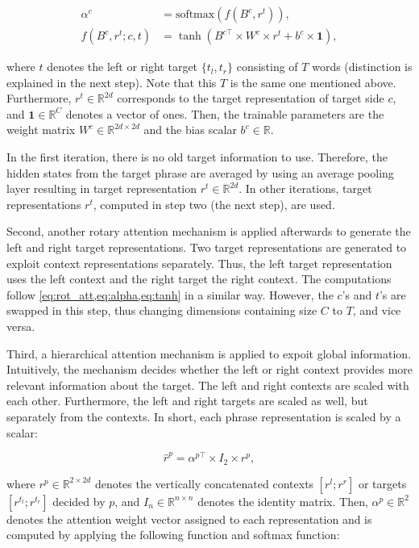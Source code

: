 \documentclass[american, oneside]{ecsgdp}
\begin{document}
\begin{align}
    \alpha^c                         & = \text{softmax}\left( f \left( B^c, r^t\right) \right), \label{eq:alpha}\\
    f \left( B^c, r^t; c, t \right) & = \tanh{\left( B^{c\top} \times W^c \times r^t + b^c \times \mathbf{1} \right)}, \label{eq:tanh}
\end{align}

\noindent where $t$ denotes the left or right target $\{t_l, t_r\}$ consisting of $T$ words (distinction is explained in the next step). Note that this $T$ is the same one mentioned above. Furthermore, $r^t \in \mathbb{R}^{2d}$ corresponds to the target representation of target side $c$, and $\mathbf{1} \in \mathbb{R}^{C}$ denotes a vector of ones. Then, the trainable parameters are the weight matrix $W^c \in \mathbb{R}^{2d \times 2d}$ and the bias scalar $b^c \in \mathbb{R}$.

In the first iteration, there is no old target information to use. Therefore, the hidden states from the target phrase are averaged by using an average pooling layer resulting in target representation $r^t \in \mathbb{R}^{2d}$. In other iterations, target representations $r^t$, computed in step two (the next step), are used.

Second, another rotary attention mechanism is applied afterwards to generate the left and right target representations. Two target representations are generated to exploit context representations separately. Thus, the left target representation uses the left context and the right target the right context. The computations follow \cref{eq:rot_att,eq:alpha,eq:tanh} in a similar way. However, the $c$'s and $t$'s are swapped in this step, thus changing dimensions containing size $C$ to $T$, and vice versa.

Third, a hierarchical attention mechanism is applied to expoit global information. Intuitively, the mechanism decides whether the left or right context provides more relevant information about the target. The left and right contexts are scaled with each other. Furthermore, the left and right targets are scaled as well, but separately from the contexts. In short, each phrase representation is scaled by a scalar:

\begin{equation}
    \hat{r}^p = \alpha^{p\top} \times I_2 \times  r^p , \label{eq:hier_att}
\end{equation}

\noindent where $r^p \in \mathbb{R}^{2 \times 2d}$ denotes the vertically concatenated contexts $[r^l; r^r]$ or targets $[r^{t_l}; r^{t_r}]$ decided by $p$, and $I_n \in \mathbb{R}^{n \times n}$ denotes the identity matrix. Then, $\alpha^p \in \mathbb{R}^2$ denotes the attention weight vector assigned to each representation and is computed by applying the following function and softmax function:
\end{document}
